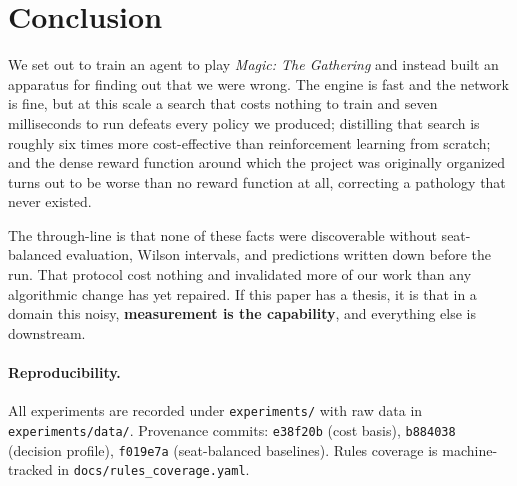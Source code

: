 \documentclass[11pt]{article}
\begin{document}
\section{Conclusion}

We set out to train an agent to play \textit{Magic: The Gathering} and instead built an apparatus for finding out that we were wrong. The engine is fast and the network is fine, but at this scale a search that costs nothing to train and seven milliseconds to run defeats every policy we produced; distilling that search is roughly six times more cost-effective than reinforcement learning from scratch; and the dense reward function around which the project was originally organized turns out to be worse than no reward function at all, correcting a pathology that never existed.

The through-line is that none of these facts were discoverable without seat-balanced evaluation, Wilson intervals, and predictions written down before the run. That protocol cost nothing and invalidated more of our work than any algorithmic change has yet repaired. If this paper has a thesis, it is that in a domain this noisy, \textbf{measurement is the capability}, and everything else is downstream.

\paragraph{Reproducibility.} All experiments are recorded under \texttt{experiments/} with raw data in \texttt{experiments/data/}. Provenance commits: \texttt{e38f20b} (cost basis), \texttt{b884038} (decision profile), \texttt{f019e7a} (seat-balanced baselines). Rules coverage is machine-tracked in \texttt{docs/rules\_coverage.yaml}.



\end{document}
